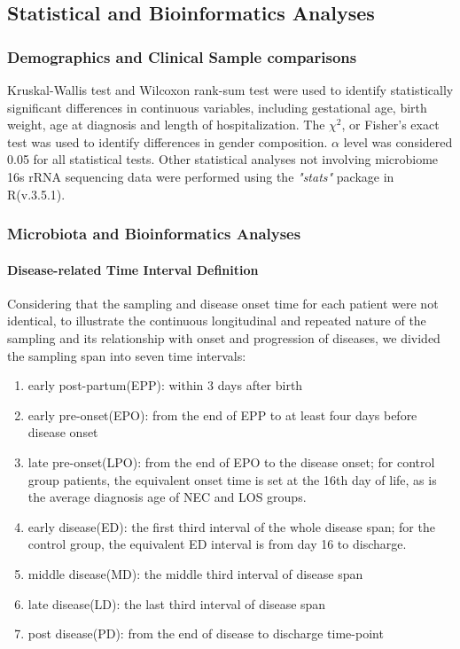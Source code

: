 \documentclass[fleqn,10pt]{wlpeerj} %
\begin{document}
  \subsection*{Statistical and Bioinformatics Analyses}
    \subsubsection*{Demographics and Clinical Sample comparisons}
    Kruskal-Wallis test and Wilcoxon rank-sum test were used to identify statistically significant differences in continuous variables, including gestational age, birth weight, age at diagnosis and length of hospitalization. The $\chi^2$, or Fisher's exact test was used to identify differences in gender composition. $\alpha$ level was considered 0.05 for all statistical tests. Other statistical analyses not involving microbiome 16s rRNA sequencing data were performed using the \textit{"stats"} package in R(v.3.5.1).
    \subsubsection*{Microbiota and Bioinformatics Analyses}
      \paragraph*{Disease-related Time Interval Definition}
      Considering that the sampling and disease onset time for each patient were not identical, to illustrate the continuous longitudinal and repeated nature of the sampling and its relationship with onset and progression of diseases, we divided  the sampling span into seven time intervals:
        \begin{enumerate}[noitemsep]
          \item early post-partum(EPP): within 3 days after birth
          \item early pre-onset(EPO): from the end of EPP to at least four days before disease onset
          \item late pre-onset(LPO): from the end of EPO to the disease onset; for control group patients, the equivalent onset time is set at the 16th day of life, as is the average diagnosis age of NEC and LOS groups.
          \item early disease(ED): the first third interval of the whole disease span; for the control group, the equivalent ED interval is from  day 16 to discharge.
          \item middle disease(MD): the middle third interval of disease span
          \item late disease(LD): the last third interval of disease span
          \item post disease(PD): from the end of disease to discharge time-point
        \end{enumerate}
\end{document}
